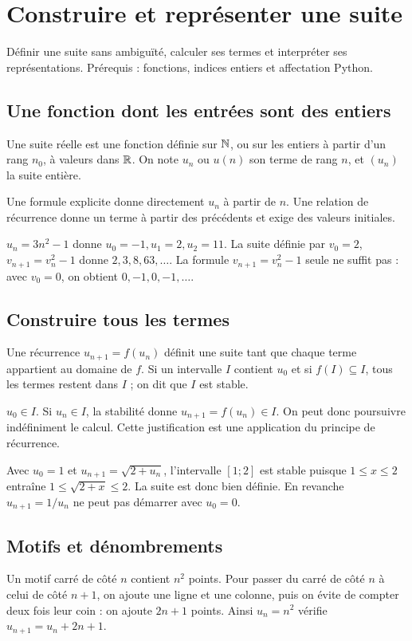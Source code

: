 \documentclass[../cours_1re.tex]{subfiles}
\begin{document}
\setcounter{chapter}{3}
\chapter{Construire et représenter une suite}
\label{ch:04}
\begin{objectif}
Définir une suite sans ambiguïté, calculer ses termes et interpréter ses représentations. Prérequis : fonctions, indices entiers et affectation Python.
\end{objectif}
\section{Une fonction dont les entrées sont des entiers}
\begin{definition}
Une suite réelle est une fonction définie sur $\mathbb{N}$, ou sur les entiers à partir d'un rang $n_0$, à valeurs dans $\mathbb{R}$. On note $u_n$ ou $u(n)$ son terme de rang $n$, et $(u_n)$ la suite entière.
\end{definition}
Une formule explicite donne directement $u_n$ à partir de $n$. Une relation de récurrence donne un terme à partir des précédents et exige des valeurs initiales.
\begin{exemple}
$u_n=3n^2-1$ donne $u_0=-1,u_1=2,u_2=11$.
La suite définie par $v_0=2$, $v_{n+1}=v_n^2-1$ donne $2,3,8,63,\ldots$.
La formule $v_{n+1}=v_n^2-1$ seule ne suffit pas : avec $v_0=0$, on obtient $0,-1,0,-1,\ldots$.
\end{exemple}
\section{Construire tous les termes}
Une récurrence $u_{n+1}=f(u_n)$ définit une suite tant que chaque terme appartient au domaine de $f$. Si un intervalle $I$ contient $u_0$ et si $f(I)\subseteq I$, tous les termes restent dans $I$ ; on dit que $I$ est stable.
\begin{demonstration}
$u_0\in I$. Si $u_n\in I$, la stabilité donne $u_{n+1}=f(u_n)\in I$. On peut donc poursuivre indéfiniment le calcul. Cette justification est une application du principe de récurrence.
\end{demonstration}
\begin{exemple}
Avec $u_0=1$ et $u_{n+1}=\sqrt{2+u_n}$, l'intervalle $[1;2]$ est stable puisque $1\le x\le2$ entraîne $1\le\sqrt{2+x}\le2$. La suite est donc bien définie. En revanche $u_{n+1}=1/u_n$ ne peut pas démarrer avec $u_0=0$.
\end{exemple}
\section{Motifs et dénombrements}
Un motif carré de côté $n$ contient $n^2$ points. Pour passer du carré de côté $n$ à celui de côté $n+1$, on ajoute une ligne et une colonne, puis on évite de compter deux fois leur coin : on ajoute $2n+1$ points. Ainsi $u_n=n^2$ vérifie $u_{n+1}=u_n+2n+1$.
\end{document}
